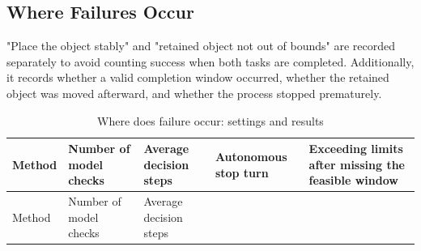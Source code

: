 \subsection{Where Failures Occur}\label{s13-detail-4}

"Place the object stably" and "retained object not out of bounds" are recorded separately to avoid counting success when both tasks are completed. Additionally, it records whether a valid completion window occurred, whether the retained object was moved afterward, and whether the process stopped prematurely.

\FloatBarrier\begingroup\small\setlength{\tabcolsep}{2.5pt}
\begin{longtable}[]{@{}
  >{\raggedright\arraybackslash}p{}
  >{\raggedright\arraybackslash}p{}
  >{\raggedright\arraybackslash}p{}
  >{\raggedright\arraybackslash}p{}
  >{\raggedright\arraybackslash}p{}@{}}
\caption{Where does failure occur: settings and results}\label{tab:s13-7}\tabularnewline
\toprule\noalign{}
\begin{minipage}[b]{\linewidth}\raggedright
Method
\end{minipage} & \begin{minipage}[b]{\linewidth}\raggedright
Number of model checks
\end{minipage} & \begin{minipage}[b]{\linewidth}\raggedright
Average decision steps
\end{minipage} & \begin{minipage}[b]{\linewidth}\raggedright
Autonomous stop turn
\end{minipage} & \begin{minipage}[b]{\linewidth}\raggedright
Exceeding limits after missing the feasible window
\end{minipage} \\
\midrule\noalign{}
\endfirsthead
\toprule\noalign{}
\begin{minipage}[b]{\linewidth}\raggedright
Method
\end{minipage} & \begin{minipage}[b]{\linewidth}\raggedright
Number of model checks
\end{minipage} & \begin{minipage}[b]{\linewidth}\raggedright
Average decision steps
\end{minipage} & \begin{minipage}[b]{\linewidth}\raggedright

\end{minipage}
\end{longtable}
